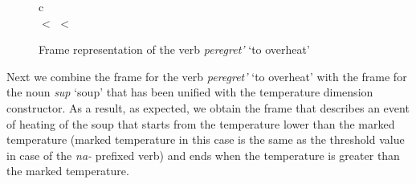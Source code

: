 \begin{figure}
\begin{center}
\begin{tabular}{c}
\\
 $<$  $<$ 
\end{tabular}
\end{center}
\caption{Frame representation of the verb \textit{peregret'} `to overheat' \label{frame:pere:gret}}
\end{figure}

Next we combine the frame for the verb \textit{peregret'} `to overheat' with the frame for the noun \textit{sup} `soup' that has been unified with the temperature dimension constructor. As a result, as expected, we obtain the frame that describes an event of heating of the soup that starts from the temperature lower than the marked temperature (marked temperature in this case is the same as the threshold value in case of the \textit{na-}  prefixed verb) and ends when the temperature is greater than the marked temperature.

